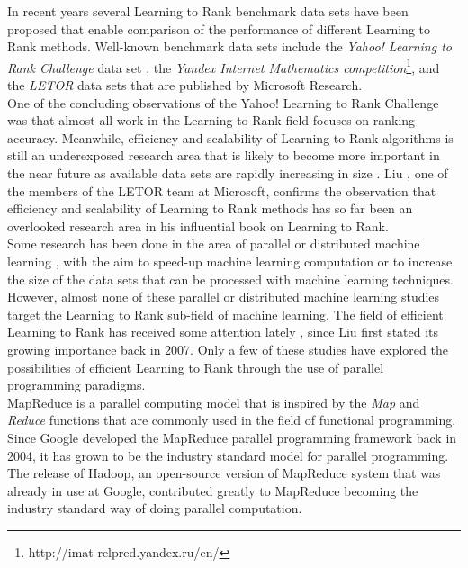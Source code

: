In recent years several Learning to Rank benchmark data sets have been proposed that enable comparison of the performance of different Learning to Rank methods. Well-known benchmark data sets include the \emph{Yahoo! Learning to Rank Challenge} data set \cite{Chapelle2011a}, the \emph{Yandex Internet Mathematics competition}\footnote{http://imat-relpred.yandex.ru/en/}, and the \emph{LETOR} data sets \cite{Qin2010} that are published by Microsoft Research.\\

One of the concluding observations of the Yahoo! Learning to Rank Challenge was that almost all work in the Learning to Rank field focuses on ranking accuracy. Meanwhile, efficiency and scalability of Learning to Rank algorithms is still an underexposed research area that is likely to become more important in the near future as available data sets are rapidly increasing in size \cite{Chapelle2011b}. Liu \cite{Liu2007}, one of the members of the LETOR team at Microsoft, confirms the observation that efficiency and scalability of Learning to Rank methods has so far been an overlooked research area in his influential book on Learning to Rank.\\

Some research has been done in the area of parallel or distributed machine learning \cite{Chu2007,Chang2007}, with the aim to speed-up machine learning computation or to increase the size of the data sets that can be processed with machine learning techniques. However, almost none of these parallel or distributed machine learning studies target the Learning to Rank sub-field of machine learning. The field of efficient Learning to Rank has received some attention lately \cite{Asadi2013a,Asadi2013b,Busa-Fekete2012,Sousa2012,Shukla2012}, since Liu \cite{Liu2007} first stated its growing importance back in 2007. Only a few of these studies \cite{Sousa2012,Shukla2012} have explored the possibilities of efficient Learning to Rank through the use of parallel programming paradigms.\\

MapReduce \cite{Dean2004} is a parallel computing model that is inspired by the \emph{Map} and \emph{Reduce} functions that are commonly used in the field of functional programming. Since Google developed the MapReduce parallel programming framework back in 2004, it has grown to be the industry standard model for parallel programming. The release of Hadoop, an open-source version of MapReduce system that was already in use at Google, contributed greatly to MapReduce becoming the industry standard way of doing parallel computation.\\


